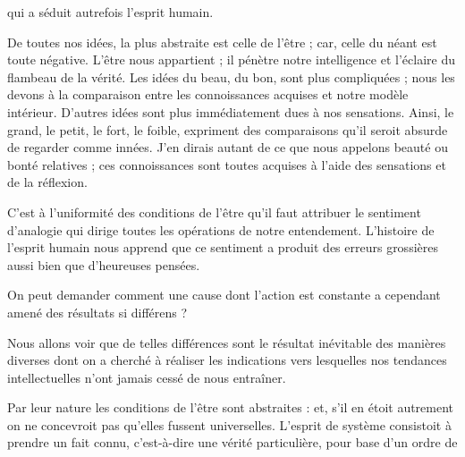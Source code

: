 \documentclass[11pt,a4paper]{article}
\begin{document}

qui a séduit autrefois l'esprit humain.

De toutes nos idées, la plus abstraite est celle de l'être ; car, celle
du néant est toute négative. L'être nous appartient ; il pénètre notre
intelligence et l'éclaire du flambeau de la vérité. Les idées du beau, du
bon, sont plus compliquées ; nous les devons à la comparaison entre les
connoissances acquises et notre modèle intérieur. D'autres idées sont plus
immédiatement dues à nos sensations. Ainsi, le grand, le petit, le fort, le
foible, expriment des comparaisons qu'il seroit absurde de regarder comme
innées. J'en dirais autant de ce que nous appelons beauté ou bonté
relatives ; ces connoissances sont toutes acquises à l'aide des sensations
et de la réflexion.

C'est à l'uniformité des conditions de l'être qu'il faut
attribuer \struck{\ill{}} le sentiment d'analogie
qui dirige toutes les opérations de notre entendement. L'histoire de
l'esprit humain nous apprend que ce sentiment a produit des erreurs
grossières aussi bien que
 d'heureuses pensées.

On peut demander comment une cause dont l'action est constante a cependant
amené des résultats si différens ?

Nous allons voir que de telles différences  sont le
résultat inévitable des manières diverses dont on a cherché à réaliser les
indications vers lesquelles nos tendances intellectuelles n'ont jamais cessé
de nous entraîner.

Par leur nature les conditions de l'être sont abstraites : et, s'il en
étoit autrement on ne concevroit pas qu'elles fussent universelles. L'esprit
de système consistoit à prendre un fait connu, c'est-à-dire une vérité
particulière, pour base d'un ordre de
\end{document}
